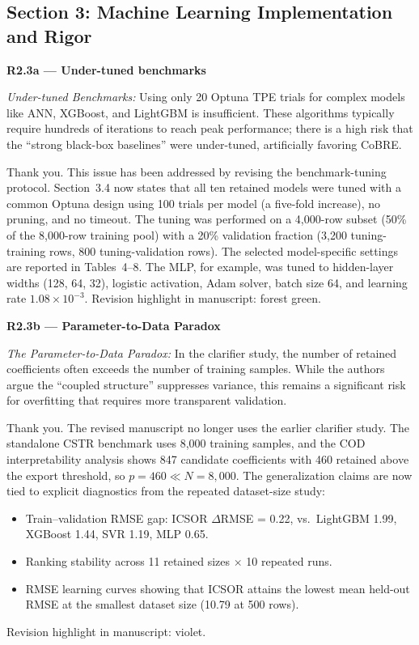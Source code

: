 \documentclass[a4paper,11pt]{article}
\newcommand{\reviewlabel}[1]{\noindent\textbf{\textcolor{accentblue}{#1}}\par\medskip}
\newcommand{\revhighlight}[2]{\textcolor{#1}{Revision highlight in manuscript: #2.}}
\begin{document}
\subsection*{Section 3: Machine Learning Implementation and Rigor}

\reviewlabel{R2.3a --- Under-tuned benchmarks}
\begin{reviewbox}
\textit{Under-tuned Benchmarks:} Using only 20 Optuna TPE trials for complex models like ANN, XGBoost, and LightGBM is insufficient. These algorithms typically require hundreds of iterations to reach peak performance; there is a high risk that the ``strong black-box baselines'' were under-tuned, artificially favoring CoBRE.
\end{reviewbox}

Thank you. This issue has been addressed by revising the benchmark-tuning protocol. Section~3.4 now states that all ten retained models were tuned with a common Optuna design using 100 trials per model (a five-fold increase), no pruning, and no timeout. The tuning was performed on a 4,000-row subset (50\% of the 8,000-row training pool) with a 20\% validation fraction (3,200 tuning-training rows, 800 tuning-validation rows). The selected model-specific settings are reported in Tables~4--8. The MLP, for example, was tuned to hidden-layer widths (128, 64, 32), logistic activation, Adam solver, batch size 64, and learning rate $1.08 \times 10^{-3}$. \revhighlight{revRtwoFour}{forest green}

\reviewlabel{R2.3b --- Parameter-to-Data Paradox}
\begin{reviewbox}
\textit{The Parameter-to-Data Paradox:} In the clarifier study, the number of retained coefficients often exceeds the number of training samples. While the authors argue the ``coupled structure'' suppresses variance, this remains a significant risk for overfitting that requires more transparent validation.
\end{reviewbox}

Thank you. The revised manuscript no longer uses the earlier clarifier study. The standalone CSTR benchmark uses 8,000 training samples, and the COD interpretability analysis shows 847 candidate coefficients with 460 retained above the export threshold, so $p = 460 \ll N = 8{,}000$. The generalization claims are now tied to explicit diagnostics from the repeated dataset-size study:
\begin{itemize}[nosep]
\item Train--validation RMSE gap: ICSOR $\Delta$RMSE = 0.22, vs.\ LightGBM 1.99, XGBoost 1.44, SVR 1.19, MLP 0.65.
\item Ranking stability across 11 retained sizes $\times$ 10 repeated runs.
\item RMSE learning curves showing that ICSOR attains the lowest mean held-out RMSE at the smallest dataset size (10.79 at 500 rows).
\end{itemize}
\revhighlight{revRtwoFive}{violet}
\end{document}

